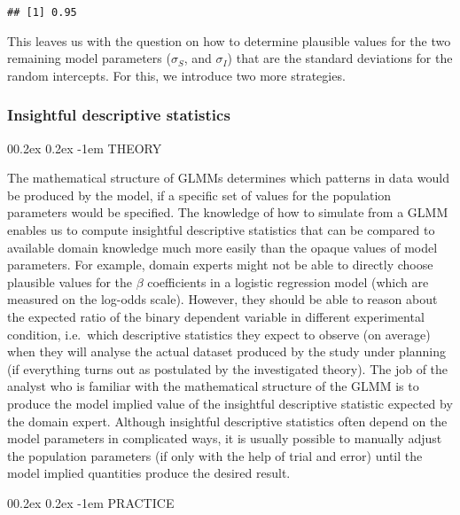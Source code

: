 \documentclass[
  man,floatsintext]{apa6}
\makeatletter
\let\oldparagraph\paragraph
\renewcommand{\paragraph}[1]{\oldparagraph{#1}\mbox{}}
\renewcommand{\paragraph}{\@startsection{paragraph}{4}{\parindent}%
  {0\baselineskip \@plus 0.2ex \@minus 0.2ex}%
  {-1em}%
  {\normalfont\normalsize\bfseries\itshape\typesectitle}}
\makeatother
\begin{document}
\begin{verbatim}
## [1] 0.95
\end{verbatim}

This leaves us with the question on how to determine plausible values for the two remaining model parameters (\(\sigma_S\), and \(\sigma_I\)) that are the standard deviations for the random intercepts.
For this, we introduce two more strategies.

\hypertarget{insightful-descriptive-statistics}{%
\subsubsection{Insightful descriptive statistics}\label{insightful-descriptive-statistics}}

\hypertarget{theory-3}{%
\paragraph{THEORY}\label{theory-3}}

The mathematical structure of GLMMs determines which patterns in data would be produced by the model, if a specific set of values for the population parameters would be specified.
The knowledge of how to simulate from a GLMM enables us to compute insightful descriptive statistics that can be compared to available domain knowledge much more easily than the opaque values of model parameters.
For example, domain experts might not be able to directly choose plausible values for the \(\beta\) coefficients in a logistic regression model (which are measured on the log-odds scale).
However, they should be able to reason about the expected ratio of the binary dependent variable in different experimental condition, i.e.~which descriptive statistics they expect to observe (on average) when they will analyse the actual dataset produced by the study under planning (if everything turns out as postulated by the investigated theory).
The job of the analyst who is familiar with the mathematical structure of the GLMM is to produce the model implied value of the insightful descriptive statistic expected by the domain expert.
Although insightful descriptive statistics often depend on the model parameters in complicated ways, it is usually possible to manually adjust the population parameters (if only with the help of trial and error) until the model implied quantities produce the desired result.

\hypertarget{practice-3}{%
\paragraph{PRACTICE}\label{practice-3}}
\end{document}
